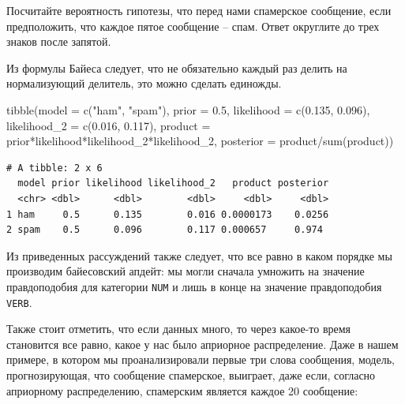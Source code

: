 \documentclass[
]{book}
\makeatletter
\newenvironment{Shaded}{\begin{snugshade}}{\end{snugshade}}
\newcommand{\AttributeTok}[1]{\textcolor[rgb]{0.77,0.63,0.00}{#1}}
\newcommand{\FloatTok}[1]{\textcolor[rgb]{0.00,0.00,0.81}{#1}}
\newcommand{\FunctionTok}[1]{\textcolor[rgb]{0.00,0.00,0.00}{#1}}
\newcommand{\NormalTok}[1]{#1}
\newcommand{\SpecialCharTok}[1]{\textcolor[rgb]{0.00,0.00,0.00}{#1}}
\newcommand{\StringTok}[1]{\textcolor[rgb]{0.31,0.60,0.02}{#1}}
\newenvironment{kframe}{%
    \medskip{}
    \setlength{\fboxsep}{.8em}
    \def\at@end@of@kframe{}%
    \ifinner\ifhmode%
    \def\at@end@of@kframe{\end{minipage}}%
    \begin{minipage}{\columnwidth}%
    \fi\fi%
    \def\FrameCommand##1{\hskip\@totalleftmargin \hskip-\fboxsep
    \colorbox{shadecolor}{##1}\hskip-\fboxsep
        \hskip-\linewidth \hskip-\@totalleftmargin \hskip\columnwidth}%
    \MakeFramed {\advance\hsize-\width
      \@totalleftmargin\z@ \linewidth\hsize
      \@setminipage}}%
  {\par\unskip\endMakeFramed%
    \at@end@of@kframe}
\newenvironment{rmdblock}[1]
  {
    \begin{itemize}
    \renewcommand{\labelitemi}{
      \raisebox{-.7\height}[0pt][0pt]{
        {\setkeys{Gin}{width=3em,keepaspectratio}\texttt{[image: images/\#1]}}
        }
        }
        \setlength{\fboxsep}{1em}
        \begin{kframe}
        \item
      }
      {
        \end{kframe}
        \end{itemize}
      }
\newenvironment{rmdtask}
      {\begin{rmdblock}{task}}
      {\end{rmdblock}}
\makeatother
\begin{document}
\begin{rmdtask}
Посчитайте вероятность гипотезы, что перед нами спамерское сообщение,
если предположить, что каждое пятое сообщение -- спам. Ответ округлите
до трех знаков после запятой.
\end{rmdtask}

Из формулы Байеса следует, что не обязательно каждый раз делить на нормализующий делитель, это можно сделать единожды.

\begin{Shaded}
\begin{Highlighting}[]
\FunctionTok{tibble}\NormalTok{(}\AttributeTok{model =} \FunctionTok{c}\NormalTok{(}\StringTok{"ham"}\NormalTok{, }\StringTok{"spam"}\NormalTok{),}
       \AttributeTok{prior =} \FloatTok{0.5}\NormalTok{,}
       \AttributeTok{likelihood =} \FunctionTok{c}\NormalTok{(}\FloatTok{0.135}\NormalTok{, }\FloatTok{0.096}\NormalTok{),}
       \AttributeTok{likelihood\_2 =} \FunctionTok{c}\NormalTok{(}\FloatTok{0.016}\NormalTok{, }\FloatTok{0.117}\NormalTok{),}
       \AttributeTok{product =}\NormalTok{ prior}\SpecialCharTok{*}\NormalTok{likelihood}\SpecialCharTok{*}\NormalTok{likelihood\_2}\SpecialCharTok{*}\NormalTok{likelihood\_2,}
       \AttributeTok{posterior =}\NormalTok{ product}\SpecialCharTok{/}\FunctionTok{sum}\NormalTok{(product))}
\end{Highlighting}
\end{Shaded}

\begin{verbatim}
# A tibble: 2 x 6
  model prior likelihood likelihood_2   product posterior
  <chr> <dbl>      <dbl>        <dbl>     <dbl>     <dbl>
1 ham     0.5      0.135        0.016 0.0000173    0.0256
2 spam    0.5      0.096        0.117 0.000657     0.974 
\end{verbatim}

Из приведенных рассуждений также следует, что все равно в каком порядке мы производим байесовский апдейт: мы могли сначала умножить на значение правдоподобия для категории \texttt{NUM} и лишь в конце на значение правдоподобия \texttt{VERB}.

Также стоит отметить, что если данных много, то через какое-то время становится все равно, какое у нас было априорное распределение. Даже в нашем примере, в котором мы проанализировали первые три слова сообщения, модель, прогнозирующая, что сообщение спамерское, выиграет, даже если, согласно априорному распределению, спамерским является каждое 20 сообщение:
\end{document}
